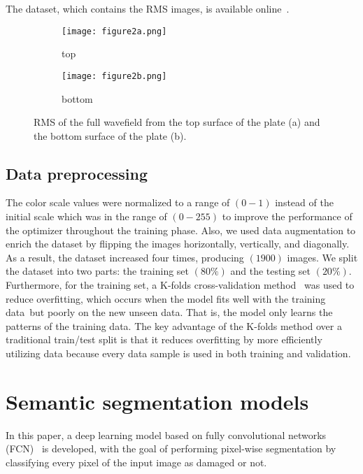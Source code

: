 \documentclass[runningheads]{llncs}
\begin{document}
The dataset, which contains the RMS images, is available online~\cite{Kudela2020d}.
\begin{figure} [h!]
	\centering
	\begin{subfigure}[b]{0.47\textwidth}
		\centering
		\texttt{[image: figure2a.png]}
		\caption{top}
		\label{fig:rmstop}
	\end{subfigure}
	\hfill
	\begin{subfigure}[b]{0.47\textwidth}
		\centering
		\texttt{[image: figure2b.png]}
		\caption{bottom}
		\label{fig:rmsbottom}
	\end{subfigure}
	\caption{RMS of the full wavefield from the top surface of the plate (a) and the bottom surface of the plate (b).}
	\label{fig:rms}
\end{figure} 
\subsection{Data preprocessing}
The color scale values were normalized to a range of \((0-1)\) instead of the initial scale which was in the range of \((0 - 255)\) to improve the performance of the optimizer throughout the training phase.
Also, we used data augmentation to enrich the dataset by flipping the images horizontally, vertically, and diagonally.
As a result, the dataset increased four times, producing \((1900)\) images.
We split the dataset into two parts: the training set \((80\%)\) and the testing set \((20\%)\).
Furthermore, for the training set, a K-folds cross-validation method~\cite{Srinivasan2019} was used to reduce overfitting, which occurs when the model fits well with the training data but poorly on the new unseen data.
That is, the model only learns the patterns of the training data.
The key advantage of the K-folds method over a traditional train/test split is that it reduces overfitting by more efficiently utilizing data because every data sample is used in both training and validation.
\section{Semantic segmentation models}
\label{section:semantic_segmentation}
In this paper, a deep learning model based on fully convolutional networks (FCN)~\cite{shelhamer2017fully} is developed, with the goal of performing pixel-wise segmentation by classifying every pixel of the input image as damaged or not. 
\end{document}
